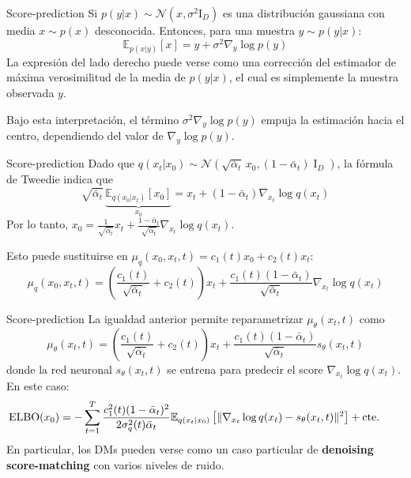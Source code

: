 \documentclass{beamer}
\begin{document}
\begin{frame}{Score-prediction}
    Si $p(y|x)\sim\mathcal{N}(x,\sigma^2\text{I}_D)$ es una distribución gaussiana con media $x\sim p(x)$ desconocida. Entonces, para una muestra $y\sim p(y|x)$:
    \begin{equation*}
        \mathbb{E}_{p(x|y)}[x]=y+\sigma^2\nabla_y \log p(y)
    \end{equation*}
    La expresión del lado derecho puede verse como una corrección del estimador de máxima verosimilitud de la media de $p(y|x)$, el cual es simplemente la muestra observada $y$.

    Bajo esta interpretación, el término $\sigma^2\nabla_y \log p(y)$ empuja la estimación hacia el centro, dependiendo del valor de $\nabla_y \log p(y)$.
\end{frame}

\begin{frame}{Score-prediction}
    Dado que $q(x_t|x_0)\sim\mathcal{N}(\sqrt{\bar\alpha_t}\,x_0,(1-\bar\alpha_t)\operatorname{I}_D)$, la fórmula de Tweedie indica que
    \begin{equation*}
        \sqrt{\bar\alpha_t} \,\underbrace{\mathbb{E}_{q(x_0|x_t)}[x_0]}_{x_0}=x_t+(1-\bar\alpha_t)\nabla_{x_t}\log q(x_t)
    \end{equation*}
    Por lo tanto, $x_0 = \frac{1}{\sqrt{\bar\alpha_t}}x_t+\frac{1-\bar\alpha_t}{\sqrt{\bar\alpha_t}}\nabla_{x_t}\log q(x_t)$.

    Esto puede sustituirse en $\mu_q(x_0,x_t,t)=c_1(t)x_0+c_2(t)x_t$:
    \begin{equation*}
        \mu_q(x_0,x_t,t) = \left(\frac{c_1(t)}{\sqrt{\bar\alpha_t}}+c_2(t)\right)x_t+ \frac{c_1(t)(1-\bar\alpha_t)}{\sqrt{\bar\alpha_t}}\nabla_{x_t}\log q(x_t)
    \end{equation*}
\end{frame}

\begin{frame}{Score-prediction}
    La igualdad anterior permite reparametrizar $\mu_\theta(x_t,t)$ como
    \begin{equation*}
        \mu_\theta(x_t,t)=\left(\frac{c_1(t)}{\sqrt{\bar\alpha_t}}+c_2(t)\right)x_t+ \frac{c_1(t)(1-\bar\alpha_t)}{\sqrt{\bar\alpha_t}}s_\theta(x_t,t)
    \end{equation*}
    donde la red neuronal $s_\theta(x_t,t)$ se entrena para predecir el score $\nabla_{x_t}\log q(x_t)$. En este caso:
    \begin{equation*}
        \hspace{-0.7cm}
        \operatorname{ELBO}(x_0) = - \sum_{t=1}^T \frac{c_1^2(t)(1-\bar\alpha_t)^2}{2\sigma_q^2(t)\bar\alpha_t}\mathbb{E}_{q(x_t|x_0)}\left[\|\nabla_{x_t}\log q(x_t)-s_\theta(x_t,t)\|^2\right]+\text{cte.}
    \end{equation*}
    En particular, los DMs pueden verse como un caso particular de \textbf{denoising score-matching} con varios niveles de ruido.
\end{frame}
\end{document}
